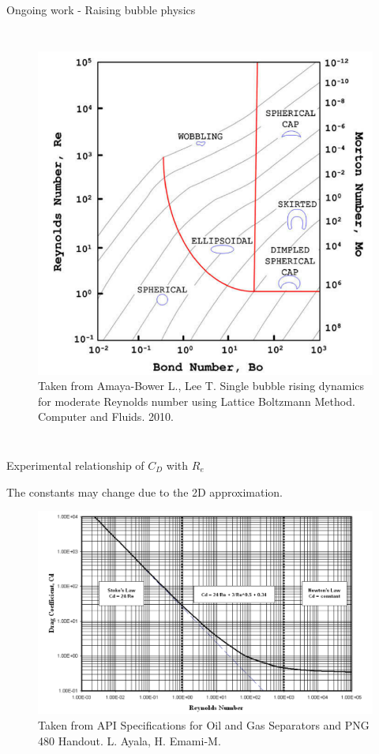 \documentclass[8pt]{beamer}
\begin{document}
\begin{frame}{Ongoing work - Raising bubble physics}
\begin{columns}[T]
			\begin{figure}
				\centering
				\includegraphics[scale=0.2]{pics/shapeRegimes.png}
				\\{\tiny \justifying Taken from Amaya-Bower L., Lee T. Single bubble rising dynamics for moderate Reynolds number using Lattice Boltzmann Method. Computer and Fluids. 2010.}
			\end{figure}
			
		\end{columns}
		
	\end{frame}
	
	\begin{frame}{Experimental relationship of $C_D$ with $R_e$}
		
		The constants may change due to the 2D approximation. 
		\begin{figure}
			\centering
			\includegraphics[scale=0.2]{pics/dragRe.png}
			\\{\tiny \justifying Taken from API Specifications for Oil and Gas Separators and PNG 480 Handout. L. Ayala, H. Emami-M. }
		\end{figure}
	\end{frame}
	
\end{document}

